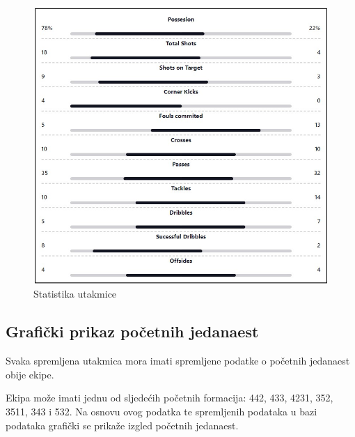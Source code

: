 \documentclass[times, utf8, zavrsni]{fer}
\begin{document}
\begin{figure}[htb]
\centering
\includegraphics[width=15cm]{images/statistic.jpg}
\caption{Statistika utakmice}
\label{fig:statistic}
\end{figure}

\subsection{Grafički prikaz početnih jedanaest}

Svaka spremljena utakmica mora imati spremljene podatke o početnih jedanaest obije ekipe.

Ekipa može imati jednu od sljedećih početnih formacija: 442, 433, 4231, 352, 3511, 343 i 532.
Na osnovu ovog podatka te spremljenih podataka u bazi podataka grafički se prikaže izgled početnih jedanaest.
\end{document}
